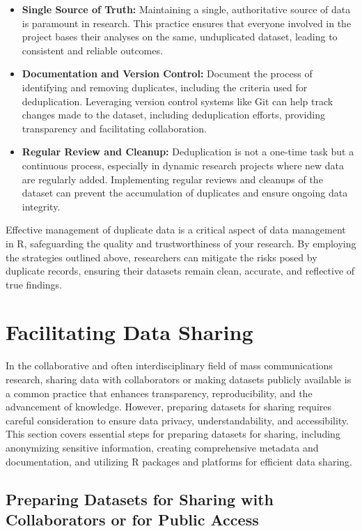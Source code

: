 \documentclass[
]{book}
\begin{document}
\begin{itemize}
\item
  \textbf{Single Source of Truth:} Maintaining a single, authoritative source of data is paramount in research. This practice ensures that everyone involved in the project bases their analyses on the same, unduplicated dataset, leading to consistent and reliable outcomes.
\item
  \textbf{Documentation and Version Control:} Document the process of identifying and removing duplicates, including the criteria used for deduplication. Leveraging version control systems like Git can help track changes made to the dataset, including deduplication efforts, providing transparency and facilitating collaboration.
\item
  \textbf{Regular Review and Cleanup:} Deduplication is not a one-time task but a continuous process, especially in dynamic research projects where new data are regularly added. Implementing regular reviews and cleanups of the dataset can prevent the accumulation of duplicates and ensure ongoing data integrity.
\end{itemize}

Effective management of duplicate data is a critical aspect of data management in R, safeguarding the quality and trustworthiness of your research. By employing the strategies outlined above, researchers can mitigate the risks posed by duplicate records, ensuring their datasets remain clean, accurate, and reflective of true findings.

\hypertarget{facilitating-data-sharing}{%
\section{Facilitating Data Sharing}\label{facilitating-data-sharing}}

In the collaborative and often interdisciplinary field of mass communications research, sharing data with collaborators or making datasets publicly available is a common practice that enhances transparency, reproducibility, and the advancement of knowledge. However, preparing datasets for sharing requires careful consideration to ensure data privacy, understandability, and accessibility. This section covers essential steps for preparing datasets for sharing, including anonymizing sensitive information, creating comprehensive metadata and documentation, and utilizing R packages and platforms for efficient data sharing.

\hypertarget{preparing-datasets-for-sharing-with-collaborators-or-for-public-access}{%
\subsection*{Preparing Datasets for Sharing with Collaborators or for Public Access}\label{preparing-datasets-for-sharing-with-collaborators-or-for-public-access}}
\end{document}
